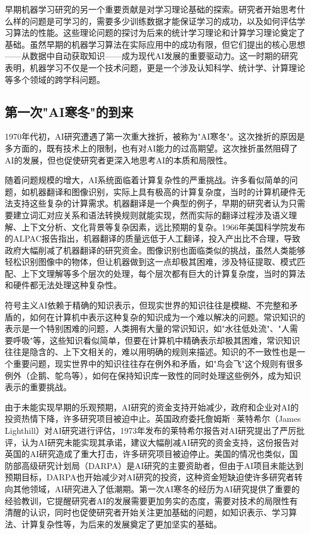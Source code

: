 早期机器学习研究的另一个重要贡献是对学习理论基础的探索。研究者开始思考什么样的问题是可学习的，需要多少训练数据才能保证学习的成功，以及如何评估学习算法的性能。这些理论问题的探讨为后来的统计学习理论和计算学习理论奠定了基础。虽然早期的机器学习算法在实际应用中的成功有限，但它们提出的核心思想——从数据中自动获取知识——成为现代AI发展的重要驱动力。这一时期的研究表明，机器学习不仅是一个技术问题，更是一个涉及认知科学、统计学、计算理论等多个领域的跨学科问题。

\subsection{第一次"AI寒冬"的到来}

1970年代初，AI研究遭遇了第一次重大挫折，被称为"AI寒冬"。这次挫折的原因是多方面的，既有技术上的限制，也有对AI能力的过高期望。这次挫折虽然阻碍了AI的发展，但也促使研究者更深入地思考AI的本质和局限性。

随着问题规模的增大，AI系统面临着计算复杂性的严重挑战。许多看似简单的问题，如机器翻译和图像识别，实际上具有极高的计算复杂度，当时的计算机硬件无法支持这些复杂的计算需求。机器翻译是一个典型的例子，早期的研究者认为只需要建立词汇对应关系和语法转换规则就能实现，然而实际的翻译过程涉及语义理解、上下文分析、文化背景等复杂因素，远比预期的复杂。1966年美国科学院发布的ALPAC报告指出，机器翻译的质量远低于人工翻译，投入产出比不合理，导致政府大幅削减了机器翻译的研究资金。图像识别也面临类似的挑战，虽然人类能够轻松识别图像中的物体，但让机器做到这一点却极其困难，涉及特征提取、模式匹配、上下文理解等多个层次的处理，每个层次都有巨大的计算复杂度，当时的算法和硬件都无法处理这种复杂性。

符号主义AI依赖于精确的知识表示，但现实世界的知识往往是模糊、不完整和矛盾的，如何在计算机中表示这种复杂的知识成为一个难以解决的问题。常识知识的表示是一个特别困难的问题，人类拥有大量的常识知识，如"水往低处流"、"人需要呼吸"等，这些知识看似简单，但要在计算机中精确表示却极其困难，常识知识往往是隐含的、上下文相关的，难以用明确的规则来描述。知识的不一致性也是一个重要问题，现实世界中的知识往往存在例外和矛盾，如"鸟会飞"这个规则有很多例外（企鹅、鸵鸟等），如何在保持知识库一致性的同时处理这些例外，成为知识表示的重要挑战。

由于未能实现早期的乐观预期，AI研究的资金支持开始减少，政府和企业对AI的投资热情下降，许多研究项目被迫中止。英国政府委托詹姆斯·莱特希尔（James Lighthill）对AI研究进行评估，1973年发布的莱特希尔报告对AI研究提出了严厉批评，认为AI研究未能实现其承诺，建议大幅削减AI研究的资金支持，这份报告对英国的AI研究造成了重大打击，许多研究项目被迫停止。美国的情况也类似，国防部高级研究计划局（DARPA）是AI研究的主要资助者，但由于AI项目未能达到预期目标，DARPA也开始减少对AI研究的投资，这种资金短缺迫使许多研究者转向其他领域，AI研究进入了低潮期。第一次AI寒冬的经历为AI研究提供了重要的经验教训，它提醒研究者AI的发展需要更加务实的态度，需要对技术的局限性有清醒的认识，同时也促使研究者开始关注更加基础的问题，如知识表示、学习算法、计算复杂性等，为后来的发展奠定了更加坚实的基础。

